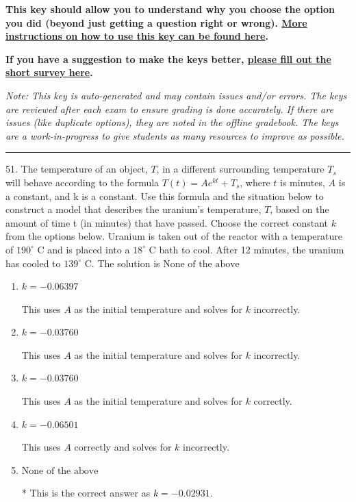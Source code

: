 \documentclass{extbook}[14pt]
\begin{document}
\textbf{This key should allow you to understand why you choose the option you did (beyond just getting a question right or wrong). \href{https://xronos.clas.ufl.edu/mac1105spring2020/courseDescriptionAndMisc/Exams/LearningFromResults}{More instructions on how to use this key can be found here}.}

\textbf{If you have a suggestion to make the keys better, \href{https://forms.gle/CZkbZmPbC9XALEE88}{please fill out the short survey here}.}

\textit{Note: This key is auto-generated and may contain issues and/or errors. The keys are reviewed after each exam to ensure grading is done accurately. If there are issues (like duplicate options), they are noted in the offline gradebook. The keys are a work-in-progress to give students as many resources to improve as possible.}

\rule{\textwidth}{0.4pt}

51. The temperature of an object, $T$, in a different surrounding temperature $T_s$ will behave according to the formula $T(t) = Ae^{kt} + T_s$, where $t$ is minutes, $A$ is a constant, and k is a constant. Use this formula and the situation below to construct a model that describes the uranium's temperature, $T$, based on the amount of time t (in minutes) that have passed. Choose the correct constant $k$ from the options below.
Uranium is taken out of the reactor with a temperature of $190^{\circ}$ C and is placed into a $18^{\circ}$ C bath to cool. After 12 minutes, the uranium has cooled to $139^{\circ}$ C. 
The solution is $ \text{None of the above} $ 

\begin{enumerate}[label=\Alph*.] 
\item $ k = -0.06397 $ 

 This uses $A$ as the initial temperature and solves for $k$ incorrectly. 
\item $ k = -0.03760 $ 

 This uses $A$ as the initial temperature and solves for $k$ incorrectly. 
\item $ k = -0.03760 $ 

 This uses $A$ as the initial temperature and solves for $k$ correctly. 
\item $ k = -0.06501 $ 

 This uses $A$ correctly and solves for $k$ incorrectly. 
\item $ \text{None of the above} $ 

 * This is the correct answer as $k = -0.02931$. 
\end{enumerate} 
 
\end{document}
